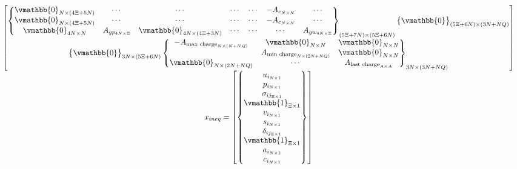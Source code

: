 \documentclass[letterpaper, 10pt, conference]{IEEEtran}
\begin{document}
\begin{equation}
\begin{array}{c}
\begin{bmatrix}
\begin{Bmatrix}
            \vmathbb{0}_{N \times (4\Xi + 5N)}   & \cdots                              & \cdots                              & \cdots                       & \cdots                            & -A_{c_{N \times N}} & \cdots \\
            \vmathbb{0}_{N \times (4\Xi + 5N)}   & \cdots                              & \cdots                              & \cdots                       & \cdots                            & -A_{c_{N \times N}} & \cdots \\
            \vmathbb{0}_{4N \times N}            & A_{gp_{4N \times \Xi}}              & \vmathbb{0}_{4N \times (4\Xi + 3N)}  & \cdots                       & \cdots                            & \cdots              & A_{gw_{4N \times \Xi}}
        \end{Bmatrix}_{(5\Xi + 7N) \times (5\Xi + 6N)}
        \begin{Bmatrix}
            \vmathbb{0}
        \end{Bmatrix}_{(5 \Xi + 6N) \times (3N + NQ)} \\
        \begin{Bmatrix}
            \vmathbb{0}
        \end{Bmatrix}_{3N \times (5\Xi + 6N)}
        \begin{Bmatrix}
            -A_{\textrm{max charge}_{N \times (N+NQ)}} & \vmathbb{0}_{N \times N}                    & \vmathbb{0}_{N \times N}                \\
                                  & A_{\textrm{min charge}_{N \times (2N+NQ)}} & \vmathbb{0}_{N \times N}                \\
            \vmathbb{0}_{N \times (2N + NQ)}           & \cdots                                     & A_{\textrm{last charge}_{A \times A}} \\
        \end{Bmatrix}_{3N \times (3N + NQ)} \\
    \end{bmatrix} \\
    x_{ineq} =
    \begin{bmatrix}
        \begin{Bmatrix}
            u_{i_{N \times 1}} \\ p_{i_{N \times 1}} \\ \sigma_{ij_{\Xi \times 1}} \\ \vmathbb{1}_{\Xi \times 1} \\ v_{i_{N \times 1}} \\ s_{i_{N \times 1}} \\ \delta_{ij_{\Xi \times 1}} \\ \vmathbb{1}_{\Xi \times 1} \\ a_{i_{N \times 1}} \\ c_{i_{N \times 1}} \\

\end{Bmatrix}
\end{bmatrix}
\end{array}
\end{equation}
\end{document}

